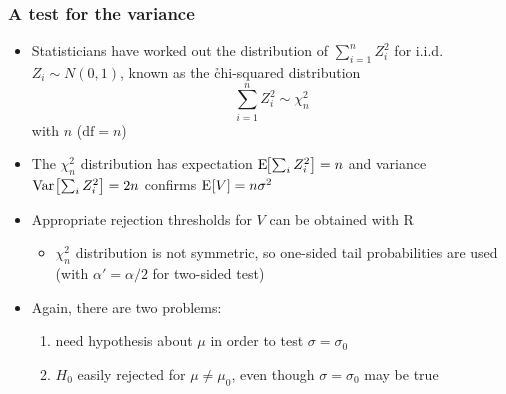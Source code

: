 \documentclass[t,notes=show]{beamer} %
\begin{document}
\begin{frame}
  \frametitle{A test for the variance}
  
  \begin{itemize}
  \item Statisticians have worked out the distribution of $\sum_{i=1}^n Z_i^2$
    for i.i.d.\ $Z_i\sim N(0,1)$, known as the \h{chi-squared distribution}
    \[
    \sum_{i=1}^n Z_i^2 \sim \chi^2_n
    \]
    with $n$  ($\text{df} = n$)
  \item The $\chi^2_n$ distribution has expectation $\mathrm{E}_{}\!\bigl[\sum_i Z_i^2\bigr] =
    n$ and variance $\mathop{\mathrm{Var}}_{}\bigl[\sum_i Z_i^2\bigr] = 2n$ \so confirms $\mathrm{E}_{}[V] = n \sigma^2$%
    \pause
  \item Appropriate rejection thresholds for $V$ can be obtained with R
    \begin{itemize}
    \item $\chi^2_n$ distribution is not symmetric, so one-sided tail
      probabilities are used (with $\alpha' = \alpha/2$ for two-sided test)
    \end{itemize}
    \pause
  \item Again, there are two problems:
    \begin{enumerate}
    \item need hypothesis about $\mu$ in order to test $\sigma = \sigma_0$
    \item $H_0$ easily rejected for $\mu \neq \mu_0$, even though
      $\sigma=\sigma_0$ may be true
    \end{enumerate}
  \end{itemize}
\end{frame}
\end{document}
